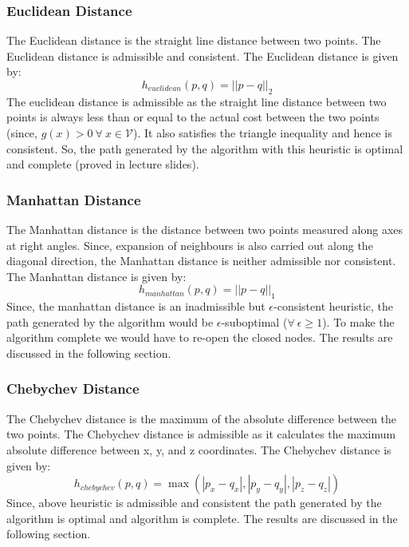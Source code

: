 \documentclass[conference]{IEEEtran}
\begin{document}
\subsubsection{Euclidean Distance}
The Euclidean distance is the straight line distance between two points. The Euclidean distance is admissible and consistent. The Euclidean distance is given by:
\begin{equation}
    h_{euclidean}(p, q) = ||p - q||_2
\end{equation}
The euclidean distance is admissible as the straight line distance between two points is always less than or equal to the actual cost between the two points (since, $g(x) > 0 \ \forall \ x \in \mathcal{V}$). It also satisfies the triangle inequality and hence is consistent.
So, the path generated by the algorithm with this heuristic is optimal and complete (proved in lecture slides).
\subsubsection{Manhattan Distance}
The Manhattan distance is the distance between two points measured along axes at right angles. Since, expansion of neighbours is also carried out along the diagonal direction, the Manhattan distance is neither admissible nor consistent. The Manhattan distance is given by:
\begin{equation}
    h_{manhattan}(p, q) = ||p - q||_1
\end{equation}
Since, the manhattan distance is an inadmissible but $\epsilon$-consistent heuristic, the path generated by the algorithm would be $\epsilon$-suboptimal ($\forall \ \epsilon \geq 1$). To make the algorithm complete
we would have to re-open the closed nodes. The results are discussed in the following section.
\subsubsection{Chebychev Distance}
The Chebychev distance is the maximum of the absolute difference between the two points. The Chebychev distance is admissible as it calculates the maximum absolute difference between x, y, and z coordinates. The Chebychev distance is given by:
\begin{equation}
    h_{chebychev}(p, q) = \max(|p_x - q_x|, |p_y - q_y|, |p_z - q_z|)
\end{equation}
Since, above heuristic is admissible and consistent the path generated by the algorithm is optimal and algorithm is complete. The results are discussed in the following section.
\end{document}
